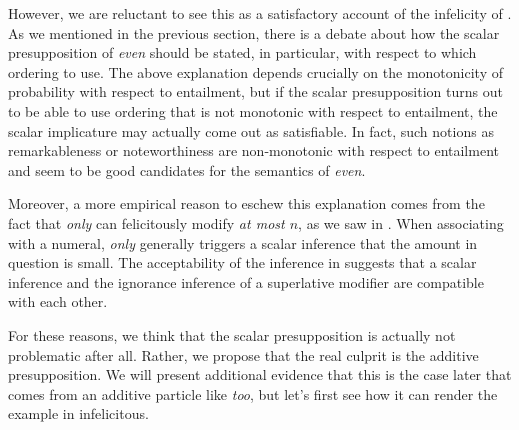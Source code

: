 \documentclass[output=paper]{langscibook}
\begin{document}
However, we are reluctant to see this as a satisfactory account of the infelicity of . As we mentioned in the previous section, there is a debate about how the scalar presupposition of \textit{even} should be stated, in particular, with respect to which ordering to use. The above explanation depends crucially on the monotonicity of probability with respect to entailment, but if the scalar presupposition turns out to be able to use ordering that is not monotonic with respect to entailment, the scalar implicature may actually come out as satisfiable. In fact, such notions as remarkableness or noteworthiness are non-monotonic with respect to entailment and seem to be good candidates for the semantics of \textit{even}.

Moreover, a more empirical reason to eschew this explanation comes from the fact that \textit{only} can felicitously modify \textit{at most $n$}, as we saw in . When associating with a numeral, \textit{only} generally triggers a scalar inference that the amount in question is small. The acceptability of the inference in  suggests that a scalar inference and the ignorance inference of a superlative modifier are compatible with each other.

For these reasons, we think that the scalar presupposition is actually not problematic after all. Rather, we propose that the real culprit is the additive presupposition. We will present additional evidence that this is the case later that comes from an additive particle like \textit{too}, but let's first see how it can render the example in  infelicitous.
\end{document}

